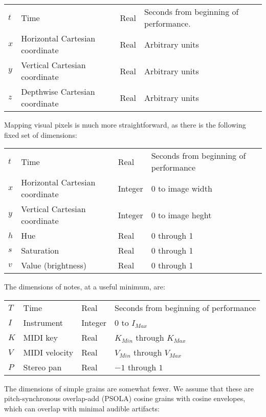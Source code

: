\documentclass[english,11pt,letterpaper,onecolumn]{scrartcl}
\begin{document}
\begin{center}
\begin{tabular}{llll}
$t$ & Time & Real & Seconds from beginning of performance.\\
$x$ & Horizontal Cartesian coordinate & Real & Arbitrary units\\
$y$ & Vertical Cartesian coordinate & Real & Arbitrary units\\
$z$ & Depthwise Cartesian coordinate & Real & Arbitrary units\\
\end{tabular}
\end{center}

\noindent Mapping visual pixels is much more straightforward, as there is the 
following fixed set of dimensions:

\begin{center}
\begin{tabular}{llll}
$t$ & Time & Real & Seconds from beginning of performance\\
$x$ & Horizontal Cartesian coordinate & Integer & 0 to image 
width\\
$y$ & Vertical Cartesian coordinate & Integer & 0 to 
image heght\\
$h$ & Hue & Real & 0 through 1\\
$s$ & Saturation & Real & 0 through 1\\
$v$ & Value (brightness) & Real & 0 through 1\\
\end{tabular}
\end{center}

\noindent The dimensions of notes, at a useful minimum, are:

\begin{center}
\begin{tabular}{llll}
$T$ & Time & Real & Seconds from beginning of performance\\
$I$ & Instrument & Integer & 0 to $I_{Max}$\\
$K$ & MIDI key & Real & $K_{Min}$ through $K_{Max}$\\
$V$ & MIDI velocity & Real & $V_{Min}$ through $V_{Max}$\\
$P$ & Stereo pan & Real & $-1$ through $1$\\
\end{tabular}
\end{center}

\noindent The dimensions of simple grains are somewhat fewer. We assume that 
these are pitch-synchronous overlap-add (PSOLA) cosine grains with cosine 
envelopes, which can overlap with minimal audible artifacts:
\end{document}
